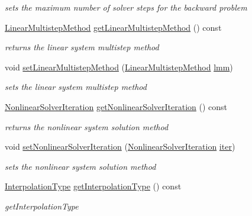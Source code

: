 \begin{DoxyCompactItemize}
\begin{DoxyCompactList}\small\item\em sets the maximum number of solver steps for the backward problem \end{DoxyCompactList}\item 
\mbox{\hyperlink{namespaceamici_a9ebe272482a8e073efe7078b7e96e8bc}{Linear\+Multistep\+Method}} \mbox{\hyperlink{classamici_1_1_solver_a60631d9a18e29c1102cae7cb77b9918c}{get\+Linear\+Multistep\+Method}} () const
\begin{DoxyCompactList}\small\item\em returns the linear system multistep method \end{DoxyCompactList}\item 
void \mbox{\hyperlink{classamici_1_1_solver_a2143a6f85b81c24611aad5689865953c}{set\+Linear\+Multistep\+Method}} (\mbox{\hyperlink{namespaceamici_a9ebe272482a8e073efe7078b7e96e8bc}{Linear\+Multistep\+Method}} \mbox{\hyperlink{classamici_1_1_solver_af71d1353291520f9ba68df79c4b9f053}{lmm}})
\begin{DoxyCompactList}\small\item\em sets the linear system multistep method \end{DoxyCompactList}\item 
\mbox{\hyperlink{namespaceamici_a13388d34e4c35bb592c3e821c35cc923}{Nonlinear\+Solver\+Iteration}} \mbox{\hyperlink{classamici_1_1_solver_a33883905a8ab056896373d76f18ce683}{get\+Nonlinear\+Solver\+Iteration}} () const
\begin{DoxyCompactList}\small\item\em returns the nonlinear system solution method \end{DoxyCompactList}\item 
void \mbox{\hyperlink{classamici_1_1_solver_a1dc7983f545ee95f7e6fb38cfb0b3286}{set\+Nonlinear\+Solver\+Iteration}} (\mbox{\hyperlink{namespaceamici_a13388d34e4c35bb592c3e821c35cc923}{Nonlinear\+Solver\+Iteration}} \mbox{\hyperlink{classamici_1_1_solver_a0ef59d3f746d2ec0e3f126b7b9989f50}{iter}})
\begin{DoxyCompactList}\small\item\em sets the nonlinear system solution method \end{DoxyCompactList}\item 
\mbox{\hyperlink{namespaceamici_a8472f01c511d77bbfb981a46618ea1ea}{Interpolation\+Type}} \mbox{\hyperlink{classamici_1_1_solver_a69568ccb5de1bcdd4344e105ddb12324}{get\+Interpolation\+Type}} () const
\begin{DoxyCompactList}\small\item\em get\+Interpolation\+Type \end{DoxyCompactList}\item 

\end{DoxyCompactItemize}
